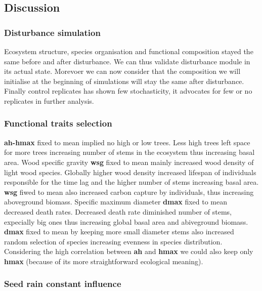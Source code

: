 \documentclass[12pt,]{article}
\theoremstyle{definition}
\theoremstyle{definition}
\theoremstyle{remark}
\begin{document}
\subsection{Discussion}\label{discussion-1}

\subsubsection{Disturbance simulation}\label{disturbance-simulation}

Ecosystem structure, species organisation and functional composition
stayed the same before and after disturbance. We can thus validate
disturbance module in its actual state. Morevoer we can now consider
that the composition we will initialise at the beginning of simulations
will stay the same after disturbance. Finally control replicates has
shown few stochasticity, it advocates for few or no replicates in
further analysis.

\subsubsection{Functional traits
selection}\label{functional-traits-selection}

\textbf{ah-hmax} fixed to mean implied no high or low trees. Less high
trees left space for more trees increasing number of stems in the
ecosystem thus increasing basal area. Wood specific gravity \textbf{wsg}
fixed to mean mainly increased wood density of light wood species.
Globally higher wood density increased lifespan of individuals
responsible for the time lag and the higher number of stems increasing
basal area. \textbf{wsg} fiwed to mean also increased carbon capture by
individuals, thus increasing aboveground biomass. Specific maximum
diameter \textbf{dmax} fixed to mean decreased death rates. Decreased
death rate diminished number of stems, expecially big ones thus
increasing global basal area and abiveground biomass. \textbf{dmax}
fixed to mean by keeping more small diameter stems also increased random
selection of species increasing evenness in species distribution.
Considering the high correlation between \textbf{ah} and \textbf{hmax}
we could also keep only \textbf{hmax} (because of its more
straightforward ecological meaning).

\subsubsection{Seed rain constant
influence}\label{seed-rain-constant-influence}
\end{document}
